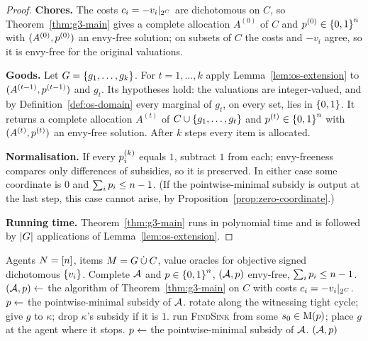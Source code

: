 \begin{proof}
\textbf{Chores.} The costs $c_i=-v_i|_{2^C}$ are dichotomous on $C$, so
Theorem~\ref{thm:g3-main} gives a complete allocation $A^{(0)}$ of $C$ and
$p^{(0)}\in\left\{0,1\right\}^n$ with $(A^{(0)},p^{(0)})$ an envy-free
solution; on subsets of $C$ the costs and $-v_i$ agree, so it is envy-free for
the original valuations.

\par\smallskip\noindent\textbf{Goods.} Let $G=\left\{g_1,\dots,g_k\right\}$. For $t=1,\dots,k$ apply
Lemma~\ref{lem:os-extension} to $(A^{(t-1)},p^{(t-1)})$ and $g_t$. Its
hypotheses hold: the valuations are integer-valued, and by
Definition~\ref{def:os-domain} every marginal of $g_t$, on every set, lies in
$\left\{0,1\right\}$. It returns a complete allocation $A^{(t)}$ of
$C\cup\left\{g_1,\dots,g_t\right\}$ and $p^{(t)}\in\left\{0,1\right\}^n$ with
$(A^{(t)},p^{(t)})$ an envy-free solution. After $k$ steps every item is
allocated.

\par\smallskip\noindent\textbf{Normalisation.} If every $p^{(k)}_i$ equals $1$, subtract $1$ from
each; envy-freeness compares only differences of subsidies, so it is preserved.
In either case some coordinate is $0$ and $\sum_ip_i\le n-1$. (If the
pointwise-minimal subsidy is output at the last step, this case cannot arise,
by Proposition~\ref{prop:zero-coordinate}.)

\par\smallskip\noindent\textbf{Running time.} Theorem~\ref{thm:g3-main} runs in polynomial time and is
followed by $\left\lvert G\right\rvert$ applications of Lemma~\ref{lem:os-extension}.
\end{proof}

\begin{algorithm}[H]
\caption{Unit subsidies for objective signed dichotomous valuations}
\label{alg:os}
\begin{algorithmic}[1]
\Require Agents $N=[n]$, items $M=G\mathbin{\dot\cup}C$, value
oracles for objective signed dichotomous $\left\{v_i\right\}$.
\Ensure Complete $\mathcal{A}$ and $p\in\left\{0,1\right\}^n$, $(\mathcal{A},p)$
envy-free, $\sum_ip_i\le n-1$.
\State $(\mathcal{A},p)\gets$ the algorithm of Theorem~\ref{thm:g3-main} on
$C$ with costs $c_i=-v_i|_{2^C}$.
  \State $p\gets$ the pointwise-minimal subsidy of $\mathcal{A}$.
    \State rotate along the witnessing tight cycle; give $g$ to $\kappa$; drop
    $\kappa$'s subsidy if it is $1$.
  \Else
    \State run \textsc{FindSink} from some $s_0\in\mathrm{M}(p)$; place $g$ at
    the agent where it stops.
  \EndIf
\EndFor
\State $p\gets$ the pointwise-minimal subsidy of $\mathcal{A}$.
\State \Return $(\mathcal{A},p)$
\end{algorithmic}
\end{algorithm}


